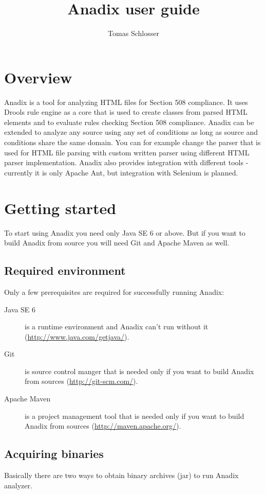 \documentclass{report}
\title{Anadix user guide}
\author{Tomas Schlosser}
\begin{document}
\maketitle
\tableofcontents

\chapter{Overview}
Anadix is a tool for analyzing HTML files for Section 508 compliance. It uses
Drools rule engine as a core that is used to create classes from parsed HTML
elements and to evaluate rules checking Section 508 compliance. Anadix can be
extended to analyze any source using any set of conditions as long as source and
conditions share the same domain. You can for example change the parser that is
used for HTML file parsing with custom written parser using different HTML
parser implementation. Anadix also provides integration with different tools -
currently it is only Apache Ant, but integration with Selenium is planned.

\chapter{Getting started}
To start using Anadix you need only Java SE 6 or above. But if you want to build
Anadix from source you will need Git and Apache Maven as well. 
\section{Required environment}
Only a few prerequisites are required for successfully running Anadix:
\begin{description}
  \item[Java SE 6] is a runtime environment and Anadix can't run without it 
  (\url{http://www.java.com/getjava/}).
  \item[Git] is source control manger that is needed only if you want to build
  Anadix from sources (\url{http://git-scm.com/}).
  \item[Apache Maven] is a project management tool that is needed only if you
  want to build Anadix from sources (\url{http://maven.apache.org/}).
\end{description}

\section{Acquiring binaries}
Basically there are two ways to obtain binary archives (jar) to run Anadix
analyzer.
\end{document}
